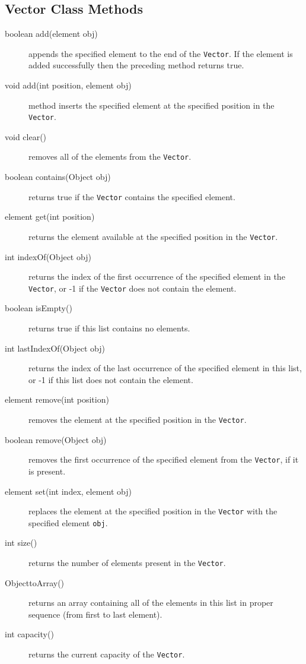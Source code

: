 \documentclass[11pt,a4paper]{article}
\begin{document}
\subsection*{Vector Class Methods}
\begin{description}
\item [boolean add(element obj)] appends the specified element to the end of the \texttt{Vector}. If the element is added successfully then the preceding method returns true.
\item [void add(int position, element obj)] method inserts the specified element at the specified position in the \texttt{Vector}.
\item [void clear()] removes all of the elements from the \texttt{Vector}.

\item [boolean contains(Object obj)] returns true if the \texttt{Vector} contains the specified element.

\item [element get(int position)] returns the element available at the specified position in the \texttt{Vector}.

\item [int indexOf(Object obj)] returns the index of the first occurrence of the specified element in the \texttt{Vector}, or -1 if the \texttt{Vector} does not contain the element.

\item [boolean isEmpty()] returns true if this list contains no elements.
\item [int lastIndexOf(Object obj)] returns the index of the last occurrence of the specified element in this list, or -1 if this list does not contain the element.
\item [element remove(int position)] removes the element at the specified position in the \texttt{Vector}.
\item [boolean remove(Object obj)] removes the first occurrence of the specified element from the \texttt{Vector}, if it is present.

\item [element set(int index, element obj)] replaces the element at the specified position in the \texttt{Vector} with the specified element \texttt{obj}.
\item [int size()] returns the number of elements present in the \texttt{Vector}.

\item [Object\lbrack \rbrack toArray()] returns an array containing all of the elements in this list in proper sequence (from first to last element).

\item [int capacity()] returns the current capacity of the \texttt{Vector}.
\end{description}
\end{document}
